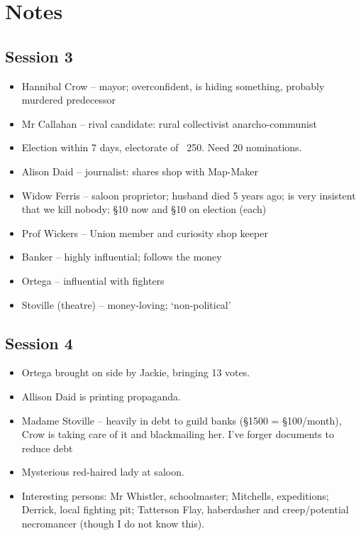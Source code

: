 \documentclass[10pt,a4paper]{article}
\begin{document}
\onecolumn

\section*{Notes}
  
\subsection*{Session 3}

  \begin{itemize}
    \item Hannibal Crow -- mayor; overconfident, is hiding something, probably murdered predecessor
    \item Mr Callahan -- rival candidate: rural collectivist anarcho-communist
    \item Election within 7 days, electorate of ~250. Need 20 nominations.
    \item Alison Daid -- journalist: shares shop with Map-Maker
    \item Widow Ferris -- saloon proprietor; husband died 5 years ago; is very insistent that we kill nobody; §10 now and §10 on election (each)
    \item Prof Wickers -- Union member and curiosity shop keeper
    \item Banker -- highly influential; follows the money
    \item Ortega -- influential with fighters
    \item Stoville (theatre) -- money-loving; `non-political'
  \end{itemize}
  
\subsection*{Session 4}
  
  \begin{itemize}
    \item Ortega brought on side by Jackie, bringing 13 votes.
    \item Allison Daid is printing propaganda.
    \item Madame Stoville -- heavily in debt to guild banks (§1500 = §100/month), Crow is taking care of it and blackmailing her. I've forger documents to reduce debt
    \item Mysterious red-haired lady at saloon.
    \item Interesting persons: Mr Whistler, schoolmaster; Mitchells, expeditions; Derrick, local fighting pit; Tatterson Flay, haberdasher and creep/potential necromancer (though I do not know this).
  \end{itemize}
  
\end{document}
